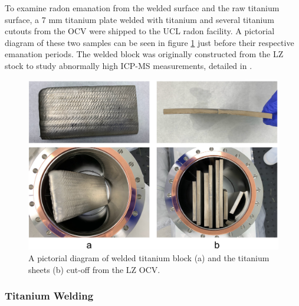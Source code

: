 To examine radon emanation from the welded surface and the raw titanium surface, a 7 mm titanium plate welded with titanium and several titanium cutouts from the OCV were shipped to the UCL radon facility. A pictorial diagram of these two samples can be seen in figure \ref{fig:titanium_welding_sheets} just before their respective emanation periods. The welded block was originally constructed from the LZ stock to study abnormally high ICP-MS measurements, detailed in \cite{lz_screening}.
%
\begin{figure}[t]
    \centering
    \includegraphics[scale=0.2]{Chapter_4/Figures/ucl_measurements/titanium_and_welding.jpg}
    \caption[A pictorial diagram of welded titanium block and the titanium sheets cut-off from the LZ OCV.]
    {A pictorial diagram of welded titanium block (a) and the titanium sheets (b) cut-off from the LZ OCV.}
    \label{fig:titanium_welding_sheets}
\end{figure}
%


\subsubsection{Titanium Welding}

